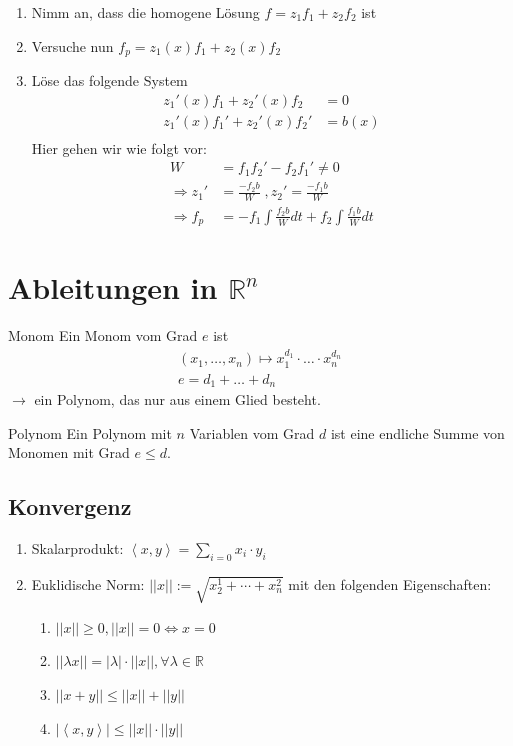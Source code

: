 \documentclass[a4paper,10pt]{article}
\def\R{\mathbb{R}}
\begin{document}
\begin{enumerate}[label=(\arabic*)]
  \item Nimm an, dass die homogene Lösung \(f = z_1 f_1 + z_2 f_2\) ist
  \item Versuche nun \(f_p = z_1(x) f_1 + z_2(x) f_2\)
  \item Löse das folgende System
  \begin{align*}
    z_1'(x) f_1 + z_2'(x) f_2 &= 0\\
    z_1'(x) f_1' + z_2'(x) f_2' &= b(x)\\
  \end{align*}
  Hier gehen wir wie folgt vor:
  \begin{align*}
    W &= f_1 f_2' - f_2 f_1' \neq 0\\
    \Rightarrow z_1' &= \frac{-f_2 b}{W} \; , z_2' = \frac{-f_1 b}{W}\\
    \Rightarrow f_p &= -f_1 \int \frac{f_2 b}{W} dt + f_2 \int \frac{f_1 b}{W} dt
  \end{align*}
\end{enumerate}

\section{Ableitungen in \texorpdfstring{\(\R^n\)}{Rⁿ}}
\begin{subbox}{Monom}
  Ein Monom vom Grad \(e\) ist
  \begin{align*}
    (x_1, \ldots, x_n) \mapsto x_1^{d_1}\cdot \ldots \cdot x_n^{d_n} \\
    e = d_1 + \ldots + d_n 
  \end{align*}
  \(\to\) ein Polynom, das nur aus einem Glied besteht.
\end{subbox}
\begin{mainbox}{Polynom}
  Ein Polynom mit \(n\) Variablen vom Grad \(d\) ist eine endliche Summe von Monomen mit Grad \(e \le d\).
\end{mainbox}

\subsection{Konvergenz}
\begin{enumerate}
  \item Skalarprodukt: \(\left< x,y\right> = \sum_{i=0} x_i \cdot y_i\)
  \item Euklidische Norm: \(||x|| := \sqrt{x_2^1 + \cdots + x_n^2}\) mit den folgenden Eigenschaften:
  \begin{enumerate}
    \item \(||x|| \ge 0, ||x|| = 0 \iff x = 0\)
    \item \(||\lambda x|| = |\lambda| \cdot ||x||, \forall \lambda \in \R\)
    \item \(||x+y|| \le ||x|| + ||y||\)
    \item \(|\left<x,y\right>| \le ||x|| \cdot ||y||\)
  \end{enumerate}
\end{enumerate}
\end{document}
